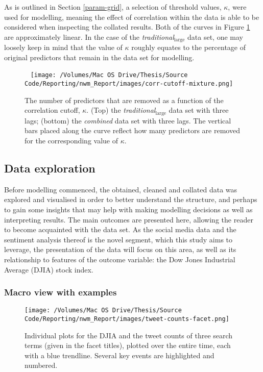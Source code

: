 \documentclass{article}
\begin{document}
As is outlined in Section \ref{param-grid}, a selection of threshold values, $\kappa$, were used for modelling, meaning the effect of correlation within the data is able to be considered when inspecting the collated results. Both of the curves in Figure \ref{fig:corr-cutoff} are approximately linear. In the case of the \emph{traditional$_{\text{large}}$} data set, one may loosely keep in mind that the value of $\kappa$ roughly equates to the percentage of original predictors that remain in the data set for modelling.

\begin{figure}\
\centering
\texttt{[image: /Volumes/Mac OS Drive/Thesis/Source Code/Reporting/nwm\_Report/images/corr-cutoff-mixture.png]}
\caption[The number of predictors removed as a function of the correlation threshold, $\kappa$]{\label{fig:corr-cutoff}The number of predictors that are removed as a function of the correlation cutoff, $\kappa$. (Top) the \emph{traditional$_{\text{large}}$} data set with three lags; (bottom) the \emph{combined} data set with three lags. The vertical bars placed along the curve reflect how many predictors are removed for the corresponding value of $\kappa$.}
\end{figure}


\pagebreak


\subsection{Data exploration \label{data-exploration}}
\label{sec-1-3}

Before modelling commenced, the obtained, cleaned and collated data was explored and visualised in order to better understand the structure, and perhaps to gain some insights that may help with making modelling decisions as well as interpreting results. The main outcomes are presented here, allowing the reader to become acquainted with the data set. As the social media data and the sentiment analysis thereof is the novel segment, which this study aims to leverage, the presentation of the data will focus on this area, as well as its relationship to features of the outcome variable: the Dow Jones Industrial Average (DJIA) stock index.


\subsubsection{Macro view with examples \label{macro-view}}
\label{sec-1-3-1}

\begin{wrapfigure}{l}{0.5\textwidth}
\centering
\texttt{[image: /Volumes/Mac OS Drive/Thesis/Source Code/Reporting/nwm\_Report/images/tweet-counts-facet.png]}
\caption[Movements of the DJIA compared to Twitter activity]{\label{fig:tweet-counts-facet}Individual plots for the DJIA and the tweet counts of three search terms (given in the facet titles), plotted over the entire time, each with a blue trendline. Several key events are highlighted and numbered.}
\end{wrapfigure}
\end{document}

